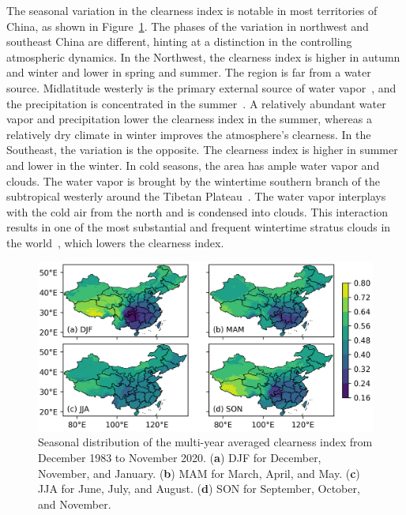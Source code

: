 \documentclass[atmosphere,article,accept,pdftex,moreauthors]{Definitions/mdpi}
\begin{document}
The seasonal variation in the clearness index is notable in most territories of China, as shown in Figure~\ref{fig:season}. The phases of the variation in northwest and southeast China are different, hinting at a distinction in the controlling atmospheric dynamics. In the Northwest, the clearness index is higher in autumn and winter and lower in spring and summer. The region is far from a water source. Midlatitude westerly is the primary external source of water vapor~\cite{yang2008JAMS, zhang2021FES}, and the precipitation is concentrated in the summer~\cite{chen2012JC}. A relatively abundant water vapor and precipitation lower the clearness index in the summer, whereas a relatively dry climate in winter improves the atmosphere's clearness. In the Southeast, the variation is the opposite. The clearness index is higher in summer and lower in the winter. In cold seasons, the area has ample water vapor and clouds. The water vapor is brought by the wintertime southern branch of the subtropical westerly around the Tibetan Plateau~\cite{yeh1950T, ding2017JGRA, li2015AASa, yin2023FES}. The water vapor interplays with the cold air from the north and is condensed into clouds. This interaction results in one of the most substantial and frequent wintertime stratus clouds in the world~\cite{klein1993JC, jin2009JGRA, chen2022AOSL}, which lowers the clearness index.

\begin{figure}[H]
  \includegraphics[width=14cm]{fig/seasons.png}
  \caption{Seasonal distribution of the multi-year averaged clearness index from December 1983 to November 2020. (\textbf{a}) DJF for December, November, and January. (\textbf{b}) MAM for March, April, and May. (\textbf{c}) JJA for June, July, and August. (\textbf{d}) SON for September, October, and November. \label{fig:season}}
\end{figure}
\end{document}
